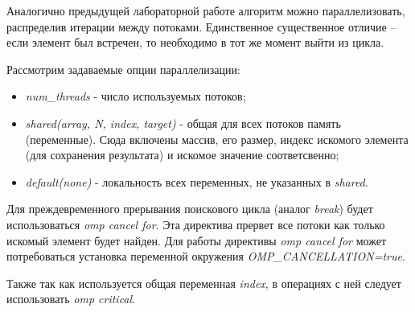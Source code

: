 Аналогично предыдущей лабораторной работе алгоритм можно параллелизовать, распределив итерации между потоками.
Единственное существенное отличие -- если элемент был встречен, то необходимо в тот же момент выйти из цикла.

Рассмотрим задаваемые опции параллелизации:
\begin{itemize}
    \item \textit{num\_threads} - число используемых потоков;
    \item \textit{shared(array, N, index, target)} - общая для всех потоков память (переменные). Сюда включены массив, его размер, индекс искомого элемента (для сохранения результата) и искомое значение соответсвенно;
    \item \textit{default(none)} - локальность всех переменных, не указанных в \textit{shared}.
\end{itemize}

Для преждевременного прерывания поискового цикла (аналог \textit{break}) будет использоваться \textit{omp cancel for}.
Эта директива прервет все потоки как только искомый элемент будет найден.
Для работы директивы \textit{omp cancel for} может потребоваться установка переменной окружения \textit{OMP\_CANCELLATION=true}.

Также так как используется общая переменная \textit{index}, в операциях с ней следует использовать \textit{omp critical}.
